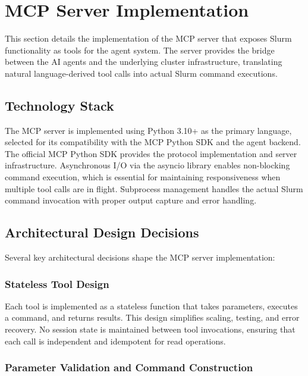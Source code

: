 \section{MCP Server Implementation}
\label{sec:mcp-implementation}

This section details the implementation of the MCP server that exposes Slurm functionality as tools for the agent system. The server provides the bridge between the AI agents and the underlying cluster infrastructure, translating natural language-derived tool calls into actual Slurm command executions.

\subsection{Technology Stack}

The MCP server is implemented using Python 3.10+ as the primary language, selected for its compatibility with the MCP Python SDK and the agent backend. The official MCP Python SDK provides the protocol implementation and server infrastructure. Asynchronous I/O via the asyncio library enables non-blocking command execution, which is essential for maintaining responsiveness when multiple tool calls are in flight. Subprocess management handles the actual Slurm command invocation with proper output capture and error handling.

\subsection{Architectural Design Decisions}

Several key architectural decisions shape the MCP server implementation:

\subsubsection{Stateless Tool Design}

Each tool is implemented as a stateless function that takes parameters, executes a command, and returns results. This design simplifies scaling, testing, and error recovery. No session state is maintained between tool invocations, ensuring that each call is independent and idempotent for read operations.

\subsubsection{Parameter Validation and Command Construction}

